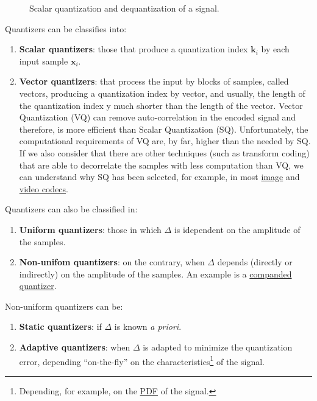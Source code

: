 \begin{figure}
  \centering
  \caption{Scalar quantization and dequantization of a signal.}
  \label{fig:Q}
\end{figure}

Quantizers can be classifies into:
\begin{enumerate}
\item \textbf{Scalar quantizers}: those that produce a quantization
  index ${\mathbf k}_i$ by each input sample ${\mathbf x}_i$.
\item \textbf{Vector quantizers}: that process the input by blocks of
  samples, called vectors, producing a quantization index by vector,
  and usually, the length of the quantization index y much shorter
  than the length of the vector. Vector Quantization (VQ) can remove
  auto-correlation in the encoded signal and therefore, is more
  efficient than Scalar Quantization (SQ). Unfortunately, the
  computational requirements of VQ are, by far, higher than the needed
  by SQ. If we also consider that there are other techniques (such as
  transform coding) that are able to decorrelate the samples with less
  computation than VQ, we can understand why SQ has been selected, for
  example, in most
  \href{https://en.wikipedia.org/wiki/Image_compression}{image} and
  \href{https://en.wikipedia.org/wiki/Video_coding_format}{video
    codecs}.
\end{enumerate}

Quantizers can also be classified in:
\begin{enumerate}
\item \textbf{Uniform quantizers}: those in which $\Delta$ is
  idependent on the amplitude of the samples.
\item \textbf{Non-unifom quantizers}: on the contrary, when $\Delta$
  depends (directly or indirectly) on the amplitude of the samples. An
  example is a
  \href{https://en.wikipedia.org/wiki/Companding}{companded
    quantizer}.
\end{enumerate}

Non-uniform quantizers can be:
\begin{enumerate}
\item \textbf{Static quantizers}: if $\Delta$ is known \emph{a
priori}.
\item \textbf{Adaptive quantizers}: when $\Delta$ is adapted to
  minimize the quantization error, depending ``on-the-fly'' on the
  characteristics\footnote{Depending, for example, on the
    \href{https://en.wikipedia.org/wiki/Probability_density_function}{PDF}
    of the signal.} of the signal.
\end{enumerate}

